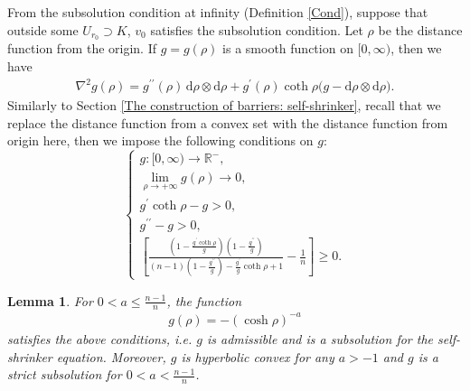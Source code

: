 \documentclass[reqno]{amsart}
\newtheorem{lemma}[theorem]{Lemma}
\theoremstyle{remark}
\theoremstyle{definition}
\numberwithin{equation}{section}
\begin{document}
From the subsolution condition at infinity (Definition \ref{Cond}), suppose that outside some $U_{r_0} \supset K$, $v_0$ satisfies the subsolution condition. Let $\rho$ be the distance function from the origin. If $g = g(\rho)$ is a smooth function on $[0, \infty)$, then we have 
\begin{align*}
    \nabla^2 g(\rho) = g^{\prime\prime}(\rho)\,\mathrm{d}\rho\otimes \mathrm{d}\rho + g^{\prime}(\rho)\coth \rho \bigl(g-\mathrm{d}\rho\otimes \mathrm{d}\rho\bigr).
\end{align*}
Similarly to Section \ref{The construction of barriers: self-shrinker}, recall that we replace the distance function from a convex set with the distance function from origin here, then we impose the following conditions on $g$:
\[
\begin{cases}
    g: [0, \infty) \to \mathbb{R^{-}}, \\
    \lim_{\rho \to +\infty} g(\rho) \to 0, \\
    g^{\prime}\coth \rho - g > 0, \\
    g^{\prime \prime} - g > 0, \\
    \left[ \frac{\left( 1-\frac{g^{\prime} \coth \rho}{g} \right) \left( 1-\frac{g^{\prime \prime}}{g} \right)}{\left( n-1 \right)\left( 1-\frac{g^{\prime \prime}}{g} \right) -\frac{g^{\prime}}{g} \coth \rho +1} - \frac{1}{n} \right] \geqslant 0.
\end{cases} 
\]
\begin{lemma}\label{smooth function g}
    For $0 < a \leqslant \frac{n-1}{n}$, the function 
    \begin{align}\label{g=}
        g(\rho) = - \left( \cosh \rho \right)^{-a}
    \end{align}
    satisfies the above conditions, i.e. $g$ is admissible and is a subsolution for the self-shrinker equation. Moreover, $g$ is hyperbolic convex for any $a>-1$ and $g$ is a strict subsolution for $0 < a < \frac{n-1}{n}$.
\end{lemma}
\end{document}
